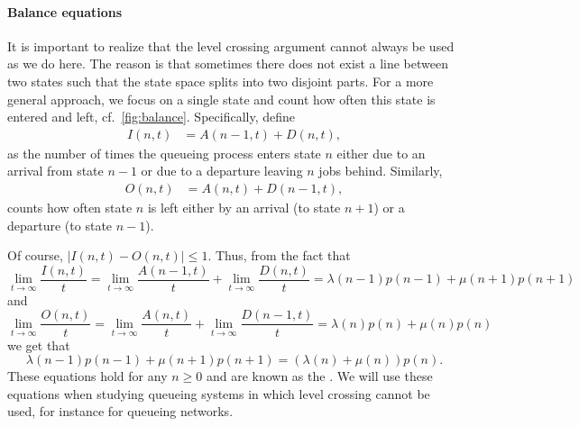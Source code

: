 \paragraph{Balance equations}

It is important to realize that the level crossing argument cannot always be used as we do here.
The reason is that sometimes there does not exist a line between two states such that the state space splits into two disjoint parts.
For a more general approach, we focus on a single state and count how often this state is entered and left, cf.~\cref{fig:balance}.
Specifically, define
\begin{align*}
  I(n,t) &= A(n-1,t) + D(n,t),
\end{align*}
as the number of times the queueing process enters state $n$ either
due to an arrival from state $n-1$ or due to a departure leaving $n$
jobs behind. Similarly,
\begin{align*}
 O(n,t) &= A(n,t) + D(n-1,t),
\end{align*}
counts how often state $n$ is left either by an arrival (to state $n+1$) or a departure (to state $n-1$).

Of course, $|I(n,t)-O(n,t)|\leq 1$. Thus, from the fact that
\begin{equation*}
\lim_{t\to\infty}  \frac{I(n,t)}t = \lim_{t\to\infty} \frac{A(n-1,t)}t + \lim_{t\to\infty} \frac{D(n,t)}t = \lambda(n-1) p(n-1) + 
\mu(n+1) p(n+1)
\end{equation*}
and 
\begin{equation*}
\lim_{t\to\infty}   \frac{O(n,t)}t = \lim_{t\to\infty} \frac{A(n,t)}t + \lim_{t\to\infty} \frac{D(n-1,t)}t = \lambda(n) p(n) + 
\mu(n) p(n)
\end{equation*}
we get that
\begin{equation*}
  \lambda(n-1)p(n-1)+\mu(n+1)p(n+1) = (\lambda(n)+\mu(n))p(n).
\end{equation*}
These equations hold for any $n\geq 0$ and are known as the
.  We will use these equations when studying
queueing systems in which level crossing cannot be used, for instance
for queueing networks.

